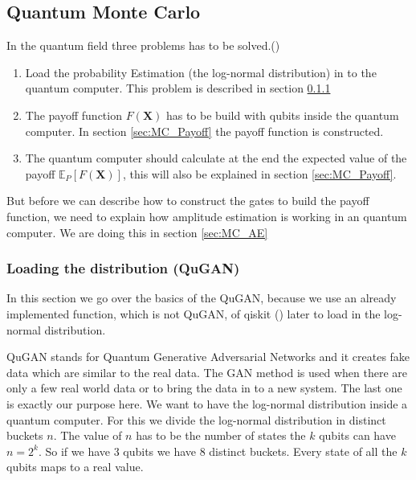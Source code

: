 \documentclass[../../main.tex]{subfiles}
\begin{document}
\subsection{Quantum Monte Carlo}\label{sec: qmc}
In the quantum field three problems has to be solved.(\cite{Stamatopoulos_2019})

\begin{enumerate}
	\item Load the probability Estimation (the log-normal distribution) in to the quantum computer. This problem is described in section \ref{sec:MC_QGAN}
	\item The payoff function $F(\textbf{X})$ has to be build with qubits inside the quantum computer. In section \ref{sec:MC_Payoff} the payoff function is constructed.
	\item The quantum computer should calculate at the end the expected value of the payoff $\mathbb{E}_P[F(\textbf{X})]$, this will also be explained in section \ref{sec:MC_Payoff}.
\end{enumerate}
But before we can describe how to construct the gates to build the payoff function, we need to explain how amplitude estimation is working in an quantum computer. We are doing this in section \ref{sec:MC_AE}

\subsubsection{Loading the distribution (QuGAN)}\label{sec:MC_QGAN}
In this section we go over the basics of the QuGAN, because we use an already implemented function, which is not QuGAN, of qiskit (\cite{Qiskit}) later to load in the log-normal distribution.

QuGAN stands for Quantum Generative Adversarial Networks and it creates fake data which are similar to the real data. The GAN method is used when there are only a few real world data or to bring the data in to a new system. The last one is exactly our purpose here. We want to have the log-normal distribution inside a quantum computer. For this we divide the log-normal distribution in distinct buckets $n$. The value of $n$ has to be the number of states the $k$ qubits can have $n=2^{k}$. So if we have 3 qubits we have 8 distinct buckets. Every state of all the $k$ qubits maps to a real value.
\end{document}
